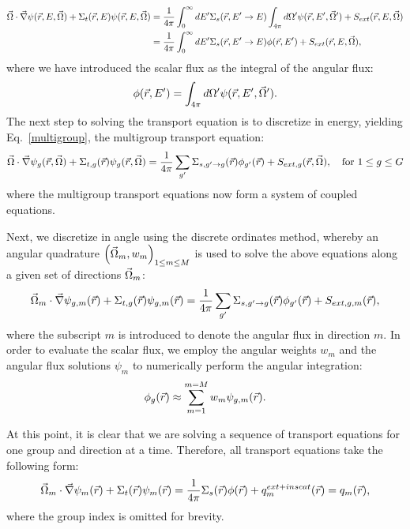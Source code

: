\begin{align}
\label{isotropic}
\vec{\Omega} \cdot \vec \nabla \psi(\vec{r},E,\vec{\Omega}) +\Sigma_t(\vec{r},E) \psi(\vec{r},E,\vec{\Omega})
& = \frac{1}{4\pi}\int_{0}^{\infty}dE' \Sigma_s(\vec{r},E'\to E) \int_{4\pi}d\Omega' \psi(\vec{r},E',\vec{\Omega}')  + S_{ext}(\vec{r},E,\vec{\Omega}) \nonumber \\
& = \frac{1}{4\pi}\int_{0}^{\infty}dE' \Sigma_s(\vec{r},E'\to E) \phi(\vec{r},E')  + S_{ext}(\vec{r},E,\vec{\Omega}) ,
\end{align}
where we have introduced the scalar flux as the integral of the angular flux:
\begin{equation}
\label{def_scalar_flux}
\phi(\vec{r},E') = \int_{4\pi}d\Omega' \psi(\vec{r},E',\vec{\Omega}').
\end{equation}
The next step to solving the transport equation is to discretize in energy, yielding Eq.~\eqref{multigroup}, the multigroup transport equation:
\begin{equation}
\vec{\Omega} \cdot \vec \nabla \psi_g(\vec{r},\vec{\Omega}) +\Sigma_{t,g}(\vec{r}) \psi_g(\vec{r},\vec{\Omega}) = \frac{1}{4\pi}\sum_{g^{\prime}}\Sigma_{s,g^{\prime}\to g}(\vec{r})\phi_{g^{\prime}}(\vec{r}) + S_{ext,g}(\vec{r},\vec{\Omega}), \quad \text{for } 1 \le g \le G
\label{multigroup}
\end{equation}
where the multigroup transport equations now form a system of coupled equations.

Next, we discretize in angle using the discrete ordinates method\cite{denovo}, whereby an angular quadrature $\left( \vec{\Omega}_m, w_m \right)_{1 \le m \le M}$ is used to solve the above equations along a given set of directions $\vec{\Omega}_m$:
\begin{equation}
\vec{\Omega}_m \cdot \vec \nabla \psi_{g,m}(\vec{r}) +\Sigma_{t,g}(\vec{r}) \psi_{g,m}(\vec{r})  = \frac{1}{4\pi}\sum_{g^{\prime}}\Sigma_{s,g^{\prime}\to g}(\vec{r})\phi_{g^{\prime}}(\vec{r}) + S_{ext,g,m}(\vec{r}),
\label{angle}
\end{equation}
where the subscript $m$ is introduced to denote the angular flux in direction $m$. In order to evaluate the scalar flux, we employ the angular weights $w_m$ and the angular flux solutions
$\psi_m$ to numerically perform the angular integration:
\begin{equation}
\label{def_scalar_flux_2}
\phi_g(\vec{r}) \approx \sum_{m=1}^{m=M} w_m \psi_{g,m}(\vec{r}).
\end{equation}

At this point, it is clear that we are solving a sequence of transport equations for one group and direction at a time. Therefore, all transport equations take the following form:
\begin{equation}
\vec{\Omega}_m \cdot \vec \nabla \psi_{m}(\vec{r}) +\Sigma_{t}(\vec{r}) \psi_{m}(\vec{r})  = \frac{1}{4\pi}\Sigma_{s}(\vec{r})\phi(\vec{r}) + q^{ext+inscat}_m(\vec{r}) = q_m(\vec{r}),
\end{equation}
where the group index is omitted for brevity.

